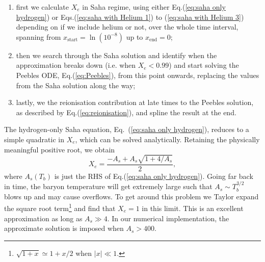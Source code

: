 \documentclass[twocolumn]{aa}
\begin{document}
\begin{enumerate}[label=(\roman*), leftmargin=12mm, rightmargin=12mm]
      \item first we calculate $X_e$ in Saha regime, using either Eq.(\ref{eq:saha only hydrogen}) or Eqs.(\ref{eq:saha with Helium 1}) to (\ref{eq:saha with Helium 3}) depending on if we include helium or not, over the whole time interval, spanning from $x_\text{start}=\ln(10^{-8})$ up to $x_\text{end} = 0$;\\
      \item then we search through the Saha solution and identify when the approximation breaks down (i.e. when $X_e<0.99$) and start solving the Peebles ODE, Eq.(\ref{eq:Peebles}), from this point onwards, replacing the values from the Saha solution along the way;\\
      \item lastly, we the reionisation contribution at late times to the Peebles solution, as described by Eq.(\ref{eq:reionisation}), and spline the result at the end.
\end{enumerate}

The hydrogen-only Saha equation, Eq.~(\ref{eq:saha only hydrogen}), reduces to a simple quadratic in $X_e$, which can be solved analytically. Retaining the physically meaningful positive root, we obtain
\begin{equation*}
      X_e = \frac{-A_s + A_s\sqrt{1 + 4/A_s}}{2},
\end{equation*}
where $A_s(T_b)$ is just the RHS of Eq.(\ref{eq:saha only hydrogen}). Going far back in time, the baryon temperature will get extremely large such that $A_s\sim T_b^{3/2}$ blows up and may cause overflows. To get around this problem we Taylor expand the square root term\footnote{$\sqrt{1+x} \simeq 1 + {x}/{2}$ when $|x|\ll 1$.} and find that $X_e =1$ in this limit. This is an excellent approximation as long as $A_s \gg 4$. In our numerical implementation, the approximate solution is imposed when $A_s > 400$.\\
\end{document}
